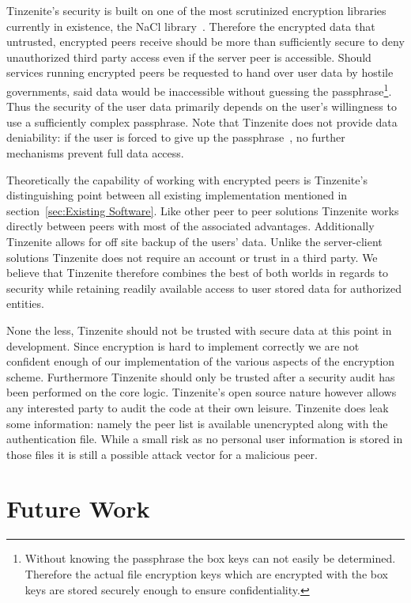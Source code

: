 Tinzenite's security is built on one of the most scrutinized encryption libraries currently in existence, the NaCl library~\cite{bernstein2009cryptography}.
Therefore the encrypted data that untrusted, encrypted peers receive should be more than sufficiently secure to deny unauthorized third party access even if the server peer is accessible.
Should services running encrypted peers be requested to hand over user data by hostile governments, said data would be inaccessible without guessing the passphrase\footnote{Without knowing the passphrase the box keys can not easily be determined. Therefore the actual file encryption keys which are encrypted with the box keys are stored securely enough to ensure confidentiality.}.
Thus the security of the user data primarily depends on the user's willingness to use a sufficiently complex passphrase.
Note that Tinzenite does not provide data deniability: if the user is forced to give up the passphrase~\cite{web:site:xkcd:pwd_wrench}, no further mechanisms prevent full data access.

Theoretically the capability of working with encrypted peers is Tinzenite's distinguishing point between all existing implementation mentioned in section~\ref{sec:Existing Software}.
Like other peer to peer solutions Tinzenite works directly between peers with most of the associated advantages.
Additionally Tinzenite allows for off site backup of the users' data.
Unlike the server-client solutions Tinzenite does not require an account or trust in a third party.
We believe that Tinzenite therefore combines the best of both worlds in regards to security while retaining readily available access to user stored data for authorized entities.

None the less, Tinzenite should not be trusted with secure data at this point in development.
Since encryption is hard to implement correctly we are not confident enough of our implementation of the various aspects of the encryption scheme.
Furthermore Tinzenite should only be trusted after a security audit has been performed on the core logic.
Tinzenite's open source nature however allows any interested party to audit the code at their own leisure.
Tinzenite does leak some information: namely the peer list is available unencrypted along with the authentication file.
While a small risk as no personal user information is stored in those files it is still a possible attack vector for a malicious peer.

\section{Future Work}
\label{sec:Future Work}

